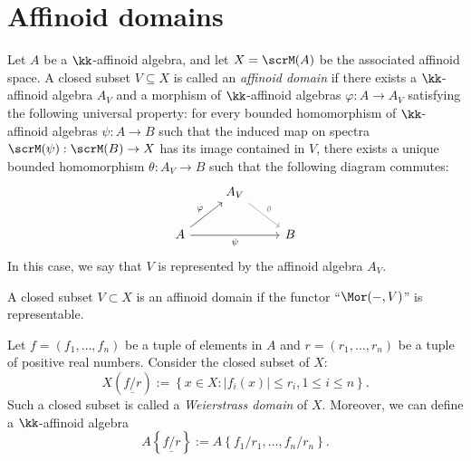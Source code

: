 \section{Affinoid domains}


    \begin{definition}\label{def:affinoid_domains}
        Let \(A\) be a \(\kk\)-affinoid algebra, and let \(X = \scrM(A)\) be the associated affinoid space.
        A closed subset \(V \subseteq X\) is called an \emph{affinoid domain} if there exists a \(\kk\)-affinoid algebra \(A_V\) and a morphism of \(\kk\)-affinoid algebras \(\varphi: A \to A_V\) satisfying the following universal property:
        for every bounded homomorphism of \(\kk\)-affinoid algebras \(\psi: A \to B\) such that the induced map on spectra \(\scrM(\psi): \scrM(B) \to X\) has its image contained in \(V\), there exists a unique bounded homomorphism \(\theta: A_V \to B\) such that the following diagram commutes:
        \[
        \begin{tikzcd}
            & A_V  \arrow[dr, gray, "\theta"] & \\
            A \arrow[ur, "\varphi"] \arrow[rr, "\psi"'] & & B
        \end{tikzcd}
        \]
        In this case, we say that \(V\) is represented by the affinoid algebra \(A_V\).
    \end{definition}
    \begin{slogan}
        A closed subset \(V \subset X\) is an affinoid domain if the functor ``\(\Mor(-, V)\)'' is representable.
    \end{slogan}



    \begin{construction}\label{constr:weierstrass_domain}
        Let \(f=(f_1,\ldots,f_n)\) be a tuple of elements in \(A\) and \(r=(r_1,\ldots,r_n)\) be a tuple of positive real numbers.
        Consider the closed subset of \(X\):
        \[ X\left(\underline{f/r}\right) := \left\{ x \in X \colon |f_i(x)| \le r_i, 1 \le i \le n \right\}. \]
        Such a closed subset is called a \emph{Weierstrass domain} of \(X\).
        Moreover, we can define a \(\kk\)-affinoid algebra
        \[ A\left\{ \underline{f/r} \right\} := A\left\{ f_1/r_1,\ldots,f_n/r_n \right\}. \]
    \end{construction}

